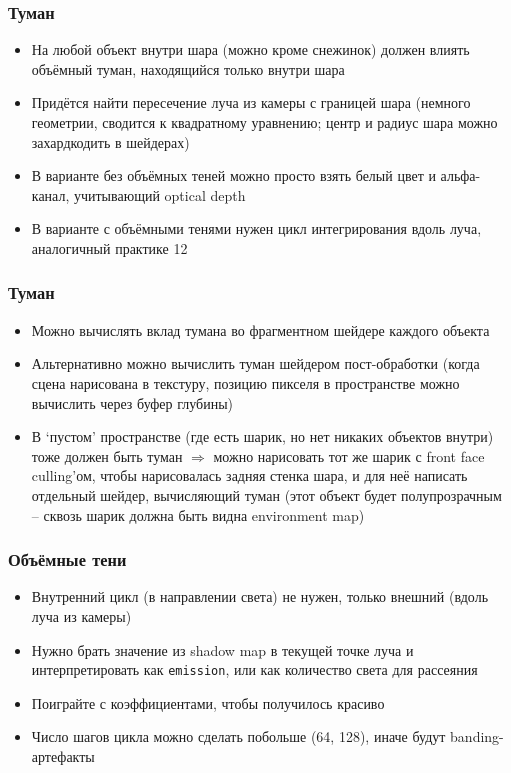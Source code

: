 \documentclass{beamer}
\begin{document}
\begin{frame}[fragile]
\frametitle{Туман}
\begin{itemize}
\item На любой объект внутри шара (можно кроме снежинок) должен влиять объёмный туман, находящийся только внутри шара
\item Придётся найти пересечение луча из камеры с границей шара (немного геометрии, сводится к квадратному уравнению; центр и радиус шара можно захардкодить в шейдерах)
\item В варианте без объёмных теней можно просто взять белый цвет и альфа-канал, учитывающий optical depth
\item В варианте с объёмными тенями нужен цикл интегрирования вдоль луча, аналогичный практике 12
\end{itemize}
\end{frame}

\begin{frame}[fragile]
\frametitle{Туман}
\begin{itemize}
\item Можно вычислять вклад тумана во фрагментном шейдере каждого объекта
\item Альтернативно можно вычислить туман шейдером пост-обработки (когда сцена нарисована в текстуру, позицию пикселя в пространстве можно вычислить через буфер глубины)
\item В `пустом' пространстве (где есть шарик, но нет никаких объектов внутри) тоже должен быть туман \begin{math}\Rightarrow\end{math} можно нарисовать тот же шарик с front face culling'ом, чтобы нарисовалась задняя стенка шара, и для неё написать отдельный шейдер, вычисляющий туман (этот объект будет полупрозрачным -- сквозь шарик должна быть видна environment map)
\end{itemize}
\end{frame}

\begin{frame}[fragile]
\frametitle{Объёмные тени}
\begin{itemize}
\item Внутренний цикл (в направлении света) не нужен, только внешний (вдоль луча из камеры)
\item Нужно брать значение из shadow map в текущей точке луча и интерпретировать как \verb|emission|, или как количество света для рассеяния
\item Поиграйте с коэффициентами, чтобы получилось красиво
\item Число шагов цикла можно сделать побольше (64, 128), иначе будут banding-артефакты
\end{itemize}
\end{frame}
\end{document}
